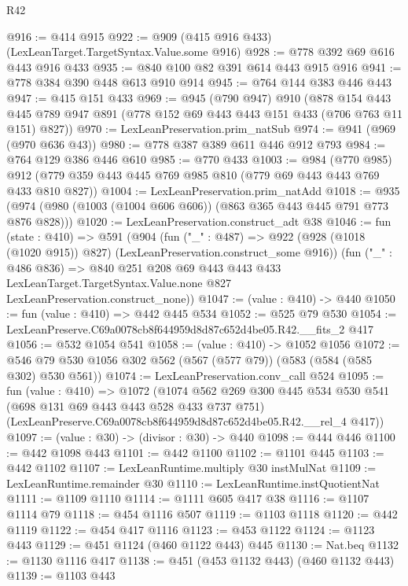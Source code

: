\begin{lexlean}{R42}
\begin{coremodule}
@916 := @414 @915
@922 := @909 (@415 @916 @433) (LexLeanTarget.TargetSyntax.Value.some @916)
@928 := @778 @392 @69 @616 @443 @916 @433
@935 := @840 @100 @82 @391 @614 @443 @915 @916
@941 := @778 @384 @390 @448 @613 @910 @914
@945 := @764 @144 @383 @446 @443
@947 := @415 @151 @433
@969 := @945
    (@790 @947)
    @910
    (@878
      @154
      @443
      @445
      @789
      @947
      @891
      (@778 @152 @69 @443 @443 @151 @433 (@706 @763 @11 @151) @827))
@970 := LexLeanPreservation.prim_natSub
@974 := @941 (@969 (@970 @636 @43))
@980 := @778 @387 @389 @611 @446 @912 @793
@984 := @764 @129 @386 @446 @610
@985 := @770 @433
@1003 := @984
    (@770 @985)
    @912
    (@779 @359 @443 @445 @769 @985 @810 (@779 @69 @443 @443 @769 @433 @810 @827))
@1004 := LexLeanPreservation.prim_natAdd
@1018 := @935 (@974 (@980 (@1003 (@1004 @606 @606)) (@863 @365 @443 @445 @791 @773 @876 @828)))
@1020 := LexLeanPreservation.construct_adt @38
@1046 := fun (state : @410) =>
  @591
    (@904
      (fun ("_" : @487) =>
      @922 (@928 (@1018 (@1020 @915)) @827) (LexLeanPreservation.construct_some @916))
      (fun ("_" : @486 @836) =>
      @840
        @251
        @208
        @69
        @443
        @443
        @433
        LexLeanTarget.TargetSyntax.Value.none
        @827
        LexLeanPreservation.construct_none))
@1047 := (value : @410) -> @440
@1050 := fun (value : @410) => @442 @445 @534
@1052 := @525 @79 @530
@1054 := LexLeanPreserve.C69a0078cb8f644959d8d87c652d4be05.R42.__fits_2 @417
@1056 := @532 @1054 @541
@1058 := (value : @410) -> @1052 @1056
@1072 := @546 @79 @530 @1056 @302 @562 (@567 (@577 @79)) (@583 (@584 (@585 @302) @530 @561))
@1074 := LexLeanPreservation.conv_call @524
@1095 := fun (value : @410) =>
  @1072
    (@1074
      @562
      @269
      @300
      @445
      @534
      @530
      @541
      (@698 @131 @69 @443 @443 @528 @433 @737 @751)
      (LexLeanPreserve.C69a0078cb8f644959d8d87c652d4be05.R42.__rel_4 @417))
@1097 := (value : @30) -> (divisor : @30) -> @440
@1098 := @444 @446
@1100 := @442 @1098 @443
@1101 := @442 @1100
@1102 := @1101 @445
@1103 := @442 @1102
@1107 := LexLeanRuntime.multiply @30 instMulNat
@1109 := LexLeanRuntime.remainder @30
@1110 := LexLeanRuntime.instQuotientNat
@1111 := @1109 @1110
@1114 := @1111 @605 @417 @38
@1116 := @1107 @1114 @79
@1118 := @454 @1116 @507
@1119 := @1103 @1118
@1120 := @442 @1119
@1122 := @454 @417 @1116
@1123 := @453 @1122
@1124 := @1123 @443
@1129 := @451 @1124 (@460 @1122 @443) @445
@1130 := Nat.beq
@1132 := @1130 @1116 @417
@1138 := @451 (@453 @1132 @443) (@460 @1132 @443)
@1139 := @1103 @443

\end{coremodule}
\end{lexlean}
